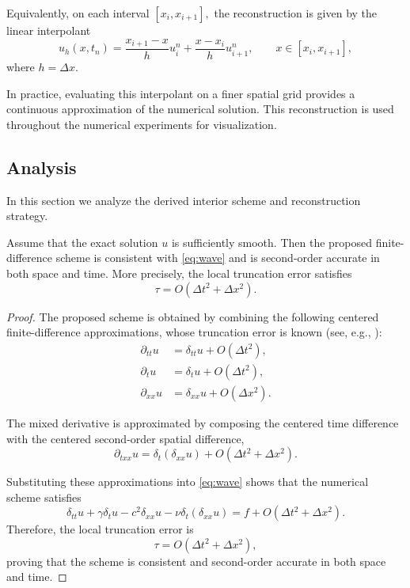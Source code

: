 \documentclass{Configuration_Files/PoliMi3i_thesis}
\begin{document}
Equivalently, on each interval
\(
[x_i,x_{i+1}],
\)
the reconstruction is given by the linear interpolant
\begin{equation*}
u_h(x,t_n)
=
\frac{x_{i+1}-x}{h}u_i^n
+
\frac{x-x_i}{h}u_{i+1}^n,
\qquad
x\in[x_i,x_{i+1}],
\end{equation*}
where
\(
h=\Delta x.
\)

In practice, evaluating this interpolant on a finer spatial grid provides a
continuous approximation of the numerical solution. This reconstruction is used
throughout the numerical experiments for visualization.

\subsection{Analysis}
In this section we analyze the derived interior scheme and reconstruction strategy.

\begin{proposition}
Assume that the exact solution $u$ is sufficiently smooth. Then the proposed finite-difference scheme is consistent with \eqref{eq:wave} and is
second-order accurate in both space and time. More precisely, the local truncation error satisfies
\begin{equation*}
\tau
=
O(\Delta t^2+\Delta x^2).
\end{equation*}
\end{proposition}

\begin{proof}
The proposed scheme is obtained by combining the following centered finite-difference approximations, whose truncation error is known (see, e.g.,
\cite{bilbao_numerical_2009,bergman_computational_2018}):
\begin{align*}
\partial_{tt}u
&=
\delta_{tt}u
+
O(\Delta t^2),\\
\partial_tu
&=
\delta_tu
+
O(\Delta t^2),\\
\partial_{xx}u
&=
\delta_{xx}u
+
O(\Delta x^2).
\end{align*}

The mixed derivative is approximated by composing the centered time difference
with the centered second-order spatial difference,
\begin{equation*}
\partial_{txx}u
=
\delta_t(\delta_{xx}u)
+
O(\Delta t^2+\Delta x^2).
\end{equation*}

Substituting these approximations into \eqref{eq:wave}
shows that the numerical scheme satisfies
\begin{equation*}
\delta_{tt}u
+\gamma\delta_tu
-c^2\delta_{xx}u
-\nu\delta_t(\delta_{xx}u)
=
f
+
O(\Delta t^2+\Delta x^2).
\end{equation*}
Therefore, the local truncation error is
\begin{equation*}
\tau
=
O(\Delta t^2+\Delta x^2),
\end{equation*}
proving that the scheme is consistent and second-order accurate in both space and time.
\end{proof}
\end{document}

